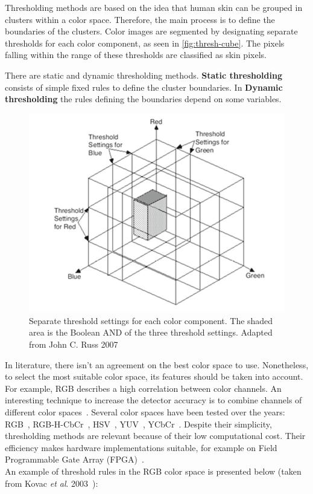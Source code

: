Thresholding methods are based on the idea that human skin can be grouped in clusters within a color space.
Therefore, the main process is to define the boundaries of the clusters.
Color images are segmented by designating separate thresholds for each color component, as seen in \autoref{fig:thresh-cube}.
The pixels falling within the range of these thresholds are classified as skin pixels.

There are static and dynamic thresholding methods.
\textbf{Static thresholding} consists of simple fixed rules to define the cluster boundaries.
In \textbf{Dynamic thresholding} the rules defining the boundaries depend on some variables.

\begin{figure}[h]
    \centering
    \includegraphics[width=0.7\linewidth]{images/approaches/thresholding/thresh_cube.png}
    \caption{Separate threshold settings for each color component.
    The shaded area is the Boolean AND of the three threshold settings. Adapted from John C. Russ 2007~\cite{zbMATH05833717}}
    \label{fig:thresh-cube}
\end{figure}

In literature, there isn't an agreement on the best color space to use. Nonetheless, to select the most suitable color space, its features should be taken into account.
For example, RGB describes a high correlation between color channels. An interesting technique to increase the detector accuracy is to combine channels of different color spaces~\cite{bin2007rgb}.
Several color spaces have been tested over the years: RGB~\cite{kovac2003human, cheddad2009skin, chen2012statistical}, RGB-H-CbCr~\cite{bin2007rgb}, HSV~\cite{garcia1999face, baskan2002projection, do2007skin}, YUV~\cite{yao2001face, vadakkepat2008multimodal}, YCbCr~\cite{garcia1999face, vadakkepat2008multimodal,  brancati2017human}.
Despite their simplicity, thresholding methods are relevant because of their low computational cost.
Their efficiency makes hardware implementations suitable, for example on Field Programmable Gate Array (FPGA)~\cite{chen2012statistical}.\\
An example of threshold rules in the RGB color space is presented below (taken from Kovac \textit{et al}. 2003~\cite{kovac2003human}):

